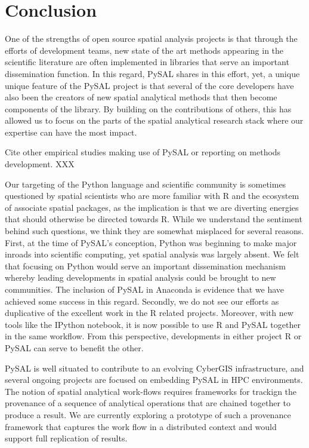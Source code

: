 \documentclass[11pt, titlepage]{article}
\begin{document}
\section{Conclusion}

One of the strengths of open source spatial analysis projects is that
through the efforts of development teams, new state of the art methods
appearing in the scientific literature are often implemented in
libraries that serve an important dissemination function. In this
regard, PySAL shares in this effort, yet, a unique unique feature of the
PySAL project is that several of the core developers have also been the
creators of new spatial analytical methods that then become components
of the library. By building on the contributions of others, this has
allowed us to focus on the parts of the spatial analytical research
stack where our expertise can have the most impact.

Cite other empirical studies making use of PySAL or reporting on methods
development. XXX

Our targeting of the Python language and scientific community is
sometimes questioned by spatial scientists who are more familiar with R
and the ecosystem of associate spatial packages, as the implication is
that we are diverting energies that should otherwise be directed towards
R. While we understand the sentiment behind such questions, we think
they are somewhat misplaced for several reasons. First, at the time of
PySAL's conception, Python was beginning to make major inroads into
scientific computing, yet spatial analysis was largely absent. We felt
that focusing on Python would serve an important dissemination mechanism
whereby leading developments in spatial analysis could be brought to new
communities. The inclusion of PySAL in Anaconda is evidence that we have
achieved some success in this regard. Secondly, we do not see our
efforts as duplicative of the excellent work in the R related projects.
Moreover, with new tools like the IPython notebook, it is now possible
to use R and PySAL together in the same workflow. From this perspective,
developments in either project R or PySAL can serve to benefit the
other.

PySAL is well situated to contribute to an evolving CyberGIS
infrastructure, and several ongoing projects are focused on embedding
PySAL in HPC environments. The notion of spatial analytical work-flows
requires frameworks for trackign the provenance of a sequence of
analytical operations that are chained together to produce a result. We
are currently exploring a prototype of such a provenance framework that
captures the work flow in a distributed context and would support full
replication of results.
\end{document}
